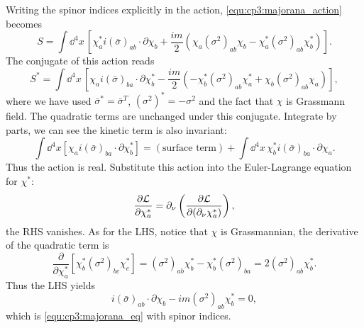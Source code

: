 \begin{problembody}
    \item Writing the spinor indices explicitly in the action, \eqref{equ:cp3:majorana_action} becomes
    \begin{equation*}
        S = \int \dd^4x \, \left[\chi_a^\ast i(\bar{\sigma})_{ab}\cdot\partial\chi_b + \frac{im}{2}\left(\chi_a(\sigma^2)_{ab}\chi_b - \chi_a^\ast (\sigma^2)_{ab}\chi_b^\ast\right)\right].
    \end{equation*}
    The conjugate of this action reads
    \begin{equation*}
        S^\ast = \int \dd^4x \, \left[\chi_a i(\bar{\sigma})_{ba}\cdot\partial\chi_b^\ast - \frac{im}{2}\left(-\chi_b^\ast (\sigma^2)_{ab}\chi_a^\ast + \chi_b (\sigma^2)_{ab} \chi_a\right)\right],
    \end{equation*}
    where we have used $\bar{\sigma}^\ast = \bar{\sigma}^T$, $(\sigma^2)^\ast = -\sigma^2$ and the fact that $\chi$ is Grassmann field. The quadratic terms are unchanged 
    under this conjugate. Integrate by parts, we can see the kinetic term is also invariant:
    \begin{equation*}
        \int \dd^4x \left[\chi_a i(\bar{\sigma})_{ba}\cdot\partial\chi_b^\ast\right] = (\text{surface term}) + \int \dd^4x \, \chi_b^\ast i (\bar{\sigma})_{ba}\cdot\partial\chi_a.
    \end{equation*}
    Thus the action is real. Substitute this action into the Euler-Lagrange equation for $\chi^\ast$:
    \begin{equation*}
        \frac{\partial \mathcal{L}}{\partial \chi_a^\ast} = \partial_\nu \left(\frac{\partial \mathcal{L}}{\partial (\partial_\nu\chi_a^\ast)}\right),
    \end{equation*}
    the RHS vanishes. As for the LHS, notice that $\chi$ is Grassmannian, the derivative of the quadratic term is
    \begin{equation*}
        \frac{\partial}{\partial\chi_a^\ast} \left[\chi_b^\ast (\sigma^2)_{bc} \chi_c^\ast\right]
        = (\sigma^2)_{ab} \chi_b^\ast - \chi_b^\ast(\sigma^2)_{ba}
        = 2 (\sigma^2)_{ab} \chi_b^\ast.
    \end{equation*}
    Thus the LHS yields
    \begin{equation*}
        i(\bar{\sigma})_{ab}\cdot\partial\chi_b - im(\sigma^2)_{ab}\chi_b^\ast = 0,
    \end{equation*}
    which is \eqref{equ:cp3:majorana_eq} with spinor indices.


\end{problembody}

